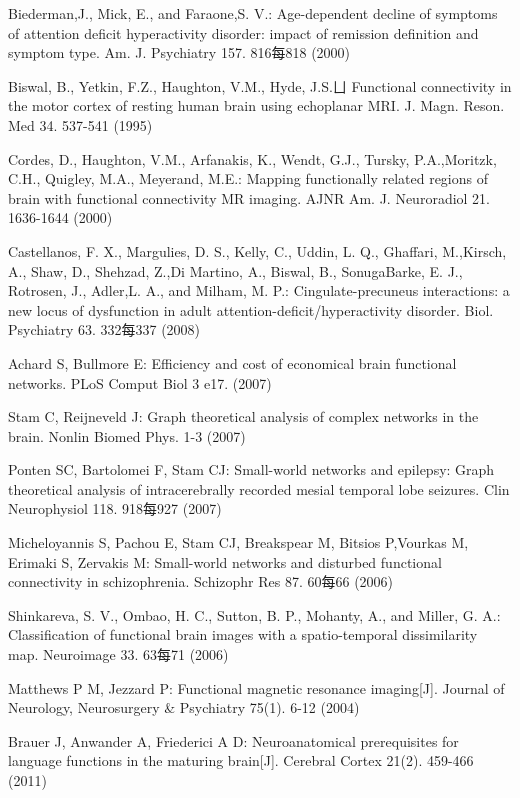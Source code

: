 \documentclass{llncs}
\begin{document}
%
%
\begin{thebibliography}{}
%
Biederman,J., Mick, E., and Faraone,S. V.:
Age-dependent decline of symptoms of attention deficit hyperactivity disorder: impact of remission definition and symptom type.
Am. J. Psychiatry 157. 816每818 (2000)

Biswal, B., Yetkin, F.Z., Haughton, V.M., Hyde, J.S.ㄩ
Functional connectivity in the motor cortex of resting human brain using echoplanar MRI.
J. Magn. Reson. Med 34. 537-541 (1995)

Cordes, D., Haughton, V.M., Arfanakis, K., Wendt, G.J., Tursky, P.A.,Moritzk, C.H., Quigley, M.A., Meyerand, M.E.:
Mapping functionally related regions of brain with functional connectivity MR imaging.
AJNR Am. J. Neuroradiol 21. 1636-1644 (2000)

Castellanos, F. X., Margulies, D. S., Kelly, C., Uddin, L. Q., Ghaffari, M.,Kirsch, A., Shaw, D., Shehzad, Z.,Di Martino, A., Biswal, B., SonugaBarke, E. J., Rotrosen, J., Adler,L. A., and Milham, M. P.:
Cingulate-precuneus interactions: a new locus of dysfunction in adult attention-deficit/hyperactivity disorder.
Biol. Psychiatry 63. 332每337 (2008)

Achard S, Bullmore E:
Efficiency and cost of economical brain functional networks.
PLoS Comput Biol 3 e17. (2007)

Stam C, Reijneveld J:
Graph theoretical analysis of complex networks in the brain.
Nonlin Biomed Phys. 1-3 (2007)

Ponten SC, Bartolomei F, Stam CJ:
Small-world networks and epilepsy: Graph theoretical analysis of intracerebrally recorded mesial temporal lobe seizures.
Clin Neurophysiol 118. 918每927 (2007)

Micheloyannis S, Pachou E, Stam CJ, Breakspear M, Bitsios P,Vourkas M, Erimaki S, Zervakis M:
Small-world networks and disturbed functional connectivity in schizophrenia.
Schizophr Res 87. 60每66 (2006)

Shinkareva, S. V., Ombao, H. C., Sutton, B. P., Mohanty, A., and Miller, G. A.:
Classification of functional brain images with a spatio-temporal dissimilarity map.
Neuroimage 33. 63每71 (2006)

Matthews P M, Jezzard P:
Functional magnetic resonance imaging[J].
Journal of Neurology, Neurosurgery \& Psychiatry 75(1). 6-12 (2004)

Brauer J, Anwander A, Friederici A D:
Neuroanatomical prerequisites for language functions in the maturing brain[J].
Cerebral Cortex 21(2). 459-466 (2011)


\end{thebibliography}
\end{document}
